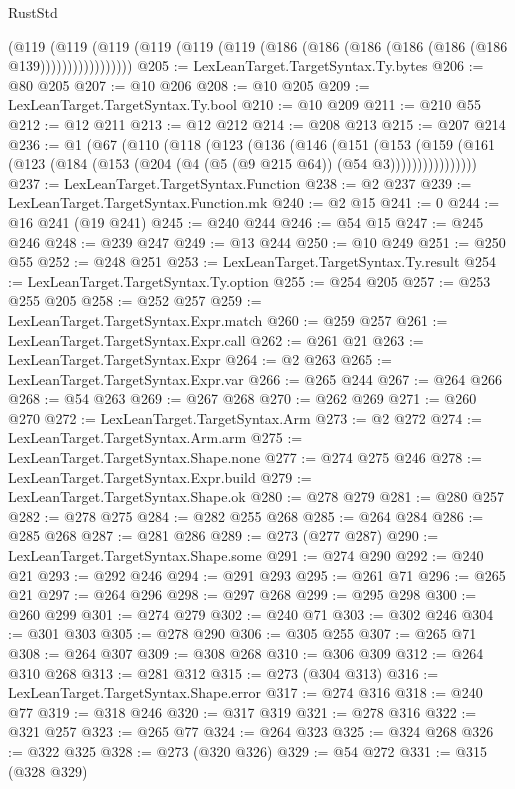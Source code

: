 \begin{lexlean}{RustStd}
\begin{coremodule}
{\begin{coremodule}
{{{{{{{{{{{{{{{{{{{{{{{{{{{{{{{{{{{{{{{{{{{{{{{{{{{{{{{{{{{{{{{{{{              (@119
                (@119
                  (@119 (@119 (@119 (@119 (@186 (@186 (@186 (@186 (@186 (@186 @139)))))))))))))))))
@205 := LexLeanTarget.TargetSyntax.Ty.bytes
@206 := @80 @205
@207 := @10 @206
@208 := @10 @205
@209 := LexLeanTarget.TargetSyntax.Ty.bool
@210 := @10 @209
@211 := @210 @55
@212 := @12 @211
@213 := @12 @212
@214 := @208 @213
@215 := @207 @214
@236 := @1
    (@67
      (@110
        (@118
          (@123
            (@136
              (@146
                (@151
                  (@153
                    (@159
                      (@161 (@123 (@184 (@153 (@204 (@4 (@5 (@9 @215 @64)) (@54 @3))))))))))))))))
@237 := LexLeanTarget.TargetSyntax.Function
@238 := @2 @237
@239 := LexLeanTarget.TargetSyntax.Function.mk
@240 := @2 @15
@241 := 0
@244 := @16 @241 (@19 @241)
@245 := @240 @244
@246 := @54 @15
@247 := @245 @246
@248 := @239 @247
@249 := @13 @244
@250 := @10 @249
@251 := @250 @55
@252 := @248 @251
@253 := LexLeanTarget.TargetSyntax.Ty.result
@254 := LexLeanTarget.TargetSyntax.Ty.option
@255 := @254 @205
@257 := @253 @255 @205
@258 := @252 @257
@259 := LexLeanTarget.TargetSyntax.Expr.match
@260 := @259 @257
@261 := LexLeanTarget.TargetSyntax.Expr.call
@262 := @261 @21
@263 := LexLeanTarget.TargetSyntax.Expr
@264 := @2 @263
@265 := LexLeanTarget.TargetSyntax.Expr.var
@266 := @265 @244
@267 := @264 @266
@268 := @54 @263
@269 := @267 @268
@270 := @262 @269
@271 := @260 @270
@272 := LexLeanTarget.TargetSyntax.Arm
@273 := @2 @272
@274 := LexLeanTarget.TargetSyntax.Arm.arm
@275 := LexLeanTarget.TargetSyntax.Shape.none
@277 := @274 @275 @246
@278 := LexLeanTarget.TargetSyntax.Expr.build
@279 := LexLeanTarget.TargetSyntax.Shape.ok
@280 := @278 @279
@281 := @280 @257
@282 := @278 @275
@284 := @282 @255 @268
@285 := @264 @284
@286 := @285 @268
@287 := @281 @286
@289 := @273 (@277 @287)
@290 := LexLeanTarget.TargetSyntax.Shape.some
@291 := @274 @290
@292 := @240 @21
@293 := @292 @246
@294 := @291 @293
@295 := @261 @71
@296 := @265 @21
@297 := @264 @296
@298 := @297 @268
@299 := @295 @298
@300 := @260 @299
@301 := @274 @279
@302 := @240 @71
@303 := @302 @246
@304 := @301 @303
@305 := @278 @290
@306 := @305 @255
@307 := @265 @71
@308 := @264 @307
@309 := @308 @268
@310 := @306 @309
@312 := @264 @310 @268
@313 := @281 @312
@315 := @273 (@304 @313)
@316 := LexLeanTarget.TargetSyntax.Shape.error
@317 := @274 @316
@318 := @240 @77
@319 := @318 @246
@320 := @317 @319
@321 := @278 @316
@322 := @321 @257
@323 := @265 @77
@324 := @264 @323
@325 := @324 @268
@326 := @322 @325
@328 := @273 (@320 @326)
@329 := @54 @272
@331 := @315 (@328 @329)
}}}}}}}}}}}}}}}}}}}}}}}}}}}}}}}}}}}}}}}}}}}}}}}}}}}}}}}}}}}}}}}}}}
\end{coremodule}}
\end{coremodule}
\end{lexlean}
